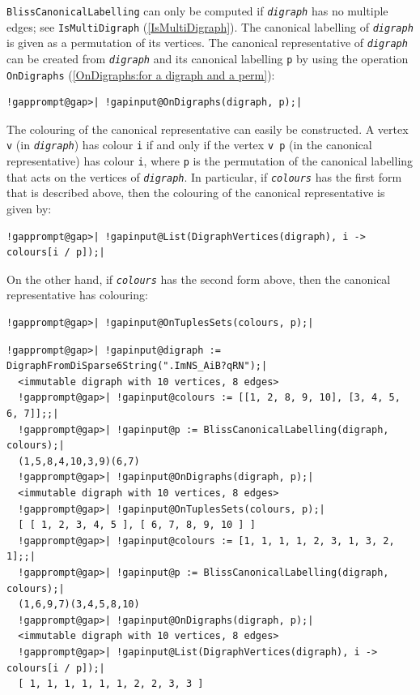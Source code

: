 \documentclass[a4paper,11pt]{report}
\begin{document}
{{{ \texttt{BlissCanonicalLabelling} can only be computed if \mbox{\texttt{\mdseries\slshape digraph}} has no multiple edges; see \texttt{IsMultiDigraph} (\ref{IsMultiDigraph}). The canonical labelling of \mbox{\texttt{\mdseries\slshape digraph}} is given as a permutation of its vertices. The canonical representative of \mbox{\texttt{\mdseries\slshape digraph}} can be created from \mbox{\texttt{\mdseries\slshape digraph}} and its canonical labelling \texttt{p} by using the operation \texttt{OnDigraphs} (\ref{OnDigraphs:for a digraph and a perm}): 
\begin{Verbatim}[commandchars=!@|,fontsize=\small,frame=single,label=Example]
  !gapprompt@gap>| !gapinput@OnDigraphs(digraph, p);|
\end{Verbatim}
 The colouring of the canonical representative can easily be constructed. A
vertex \texttt{v} (in \mbox{\texttt{\mdseries\slshape digraph}}) has colour \texttt{i} if and only if the vertex \texttt{v \texttt{} p} (in the canonical representative) has colour \texttt{i}, where \texttt{p} is the permutation of the canonical labelling that acts on the vertices of \mbox{\texttt{\mdseries\slshape digraph}}. In particular, if \mbox{\texttt{\mdseries\slshape colours}} has the first form that is described above, then the colouring of the
canonical representative is given by: 
\begin{Verbatim}[commandchars=!@|,fontsize=\small,frame=single,label=Example]
  !gapprompt@gap>| !gapinput@List(DigraphVertices(digraph), i -> colours[i / p]);|
\end{Verbatim}
 On the other hand, if \mbox{\texttt{\mdseries\slshape colours}} has the second form above, then the canonical representative has colouring: 
\begin{Verbatim}[commandchars=!@|,fontsize=\small,frame=single,label=Example]
  !gapprompt@gap>| !gapinput@OnTuplesSets(colours, p);|
\end{Verbatim}
 

 
\begin{Verbatim}[commandchars=!@|,fontsize=\small,frame=single,label=Example]
  !gapprompt@gap>| !gapinput@digraph := DigraphFromDiSparse6String(".ImNS_AiB?qRN");|
  <immutable digraph with 10 vertices, 8 edges>
  !gapprompt@gap>| !gapinput@colours := [[1, 2, 8, 9, 10], [3, 4, 5, 6, 7]];;|
  !gapprompt@gap>| !gapinput@p := BlissCanonicalLabelling(digraph, colours);|
  (1,5,8,4,10,3,9)(6,7)
  !gapprompt@gap>| !gapinput@OnDigraphs(digraph, p);|
  <immutable digraph with 10 vertices, 8 edges>
  !gapprompt@gap>| !gapinput@OnTuplesSets(colours, p);|
  [ [ 1, 2, 3, 4, 5 ], [ 6, 7, 8, 9, 10 ] ]
  !gapprompt@gap>| !gapinput@colours := [1, 1, 1, 1, 2, 3, 1, 3, 2, 1];;|
  !gapprompt@gap>| !gapinput@p := BlissCanonicalLabelling(digraph, colours);|
  (1,6,9,7)(3,4,5,8,10)
  !gapprompt@gap>| !gapinput@OnDigraphs(digraph, p);|
  <immutable digraph with 10 vertices, 8 edges>
  !gapprompt@gap>| !gapinput@List(DigraphVertices(digraph), i -> colours[i / p]);|
  [ 1, 1, 1, 1, 1, 1, 2, 2, 3, 3 ]
\end{Verbatim}
 }

}}
\end{document}
